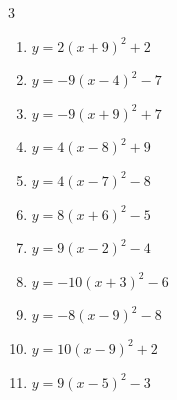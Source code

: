 \begin{multicols}{3}
\begin{enumerate}
        \phantom{$\displaystyle 頂点\left( 7 , -4 \right)$}

  \item $\displaystyle y=2\left( x+9\right)^{2}+2$

        \phantom{$\displaystyle 頂点\left( -9 , 2 \right)$}

  \item $\displaystyle y=-9\left( x-4\right)^{2}-7$

        \phantom{$\displaystyle 頂点\left( 4 , -7 \right)$}

  \item $\displaystyle y=-9\left( x+9\right)^{2}+7$

        \phantom{$\displaystyle 頂点\left( -9 , 7 \right)$}

  \item $\displaystyle y=4\left( x-8\right)^{2}+9$

        \phantom{$\displaystyle 頂点\left( 8 , 9 \right)$}

\columnbreak %

\resetques

  \item $\displaystyle y=4\left( x-7\right)^{2}-8$

        \phantom{$\displaystyle 頂点\left( 7 , -8 \right)$}

  \item $\displaystyle y=8\left( x+6\right)^{2}-5$

        \phantom{$\displaystyle 頂点\left( -6 , -5 \right)$}

  \item $\displaystyle y=9\left( x-2\right)^{2}-4$

        \phantom{$\displaystyle 頂点\left( 2 , -4 \right)$}

  \item $\displaystyle y=-10\left( x+3\right)^{2}-6$

        \phantom{$\displaystyle 頂点\left( -3 , -6 \right)$}

  \item $\displaystyle y=-8\left( x-9\right)^{2}-8$

        \phantom{$\displaystyle 頂点\left( 9 , -8 \right)$}

  \item $\displaystyle y=10\left( x-9\right)^{2}+2$

        \phantom{$\displaystyle 頂点\left( 9 , 2 \right)$}

  \item $\displaystyle y=9\left( x-5\right)^{2}-3$


\end{enumerate}
\end{multicols}
